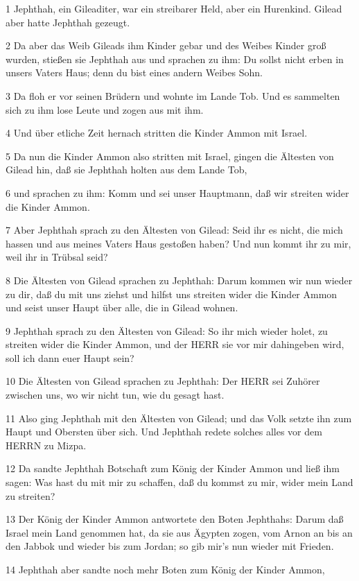 \par 1 Jephthah, ein Gileaditer, war ein streibarer Held, aber ein Hurenkind. Gilead aber hatte Jephthah gezeugt.
\par 2 Da aber das Weib Gileads ihm Kinder gebar und des Weibes Kinder groß wurden, stießen sie Jephthah aus und sprachen zu ihm: Du sollst nicht erben in unsers Vaters Haus; denn du bist eines andern Weibes Sohn.
\par 3 Da floh er vor seinen Brüdern und wohnte im Lande Tob. Und es sammelten sich zu ihm lose Leute und zogen aus mit ihm.
\par 4 Und über etliche Zeit hernach stritten die Kinder Ammon mit Israel.
\par 5 Da nun die Kinder Ammon also stritten mit Israel, gingen die Ältesten von Gilead hin, daß sie Jephthah holten aus dem Lande Tob,
\par 6 und sprachen zu ihm: Komm und sei unser Hauptmann, daß wir streiten wider die Kinder Ammon.
\par 7 Aber Jephthah sprach zu den Ältesten von Gilead: Seid ihr es nicht, die mich hassen und aus meines Vaters Haus gestoßen haben? Und nun kommt ihr zu mir, weil ihr in Trübsal seid?
\par 8 Die Ältesten von Gilead sprachen zu Jephthah: Darum kommen wir nun wieder zu dir, daß du mit uns ziehst und hilfst uns streiten wider die Kinder Ammon und seist unser Haupt über alle, die in Gilead wohnen.
\par 9 Jephthah sprach zu den Ältesten von Gilead: So ihr mich wieder holet, zu streiten wider die Kinder Ammon, und der HERR sie vor mir dahingeben wird, soll ich dann euer Haupt sein?
\par 10 Die Ältesten von Gilead sprachen zu Jephthah: Der HERR sei Zuhörer zwischen uns, wo wir nicht tun, wie du gesagt hast.
\par 11 Also ging Jephthah mit den Ältesten von Gilead; und das Volk setzte ihn zum Haupt und Obersten über sich. Und Jephthah redete solches alles vor dem HERRN zu Mizpa.
\par 12 Da sandte Jephthah Botschaft zum König der Kinder Ammon und ließ ihm sagen: Was hast du mit mir zu schaffen, daß du kommst zu mir, wider mein Land zu streiten?
\par 13 Der König der Kinder Ammon antwortete den Boten Jephthahs: Darum daß Israel mein Land genommen hat, da sie aus Ägypten zogen, vom Arnon an bis an den Jabbok und wieder bis zum Jordan; so gib mir's nun wieder mit Frieden.
\par 14 Jephthah aber sandte noch mehr Boten zum König der Kinder Ammon,
